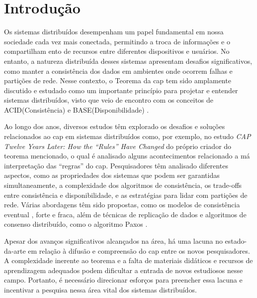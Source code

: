 
\chapter{Introdução}\label{cap:introducao}

Os sistemas distribuídos desempenham um papel fundamental em nossa sociedade cada vez mais conectada, permitindo a troca de informações e o compartilham
ento de recursos entre diferentes dispositivos e usuários. No entanto, a natureza distribuída desses sistemas apresentam desafios significativos, como manter a consistência dos dados em ambientes onde ocorrem falhas e partições de rede. Nesse contexto, o Teorema da \gls{cap} tem sido amplamente discutido e estudado como um importante princípio para projetar e entender sistemas distribuídos, visto que veio de encontro com os conceitos de ACID(Consistência) e BASE(Disponibilidade) \cite{ConsistencyInACIDAndCAPTheoremStackOverFlow2013}.

Ao longo dos anos, diversos estudos têm explorado os desafios e soluções relacionados ao \gls{cap} em sistemas distribuídos como, por exemplo, no estudo \textit{CAP Twelve Years Later: How the ``Rules'' Have Changed} \cite{BrewerTwentyYearsLaterEricBrewer2012} do próprio criador do teorema mencionado, o qual é analisado alguns acontecimentos relacionado a má interpretação das ``regras''    do \gls{cap}. Pesquisadores têm analisado diferentes aspectos, como as propriedades dos sistemas que podem ser garantidas simultaneamente, a complexidade dos algoritmos de consistência, os trade-offs entre consistência e disponibilidade, e as estratégias para lidar com partições de rede. Várias abordagens têm sido propostas, como os modelos de consistência eventual \cite{EventuallyConsistentWernerVogels2009}, forte e fraca, além de técnicas de replicação de dados e algoritmos de consenso distribuído, como o algoritmo Paxos \cite{PaxosMadeSimpleLamport2001}.

Apesar dos avanços significativos alcançados na área, há uma lacuna no estado-da-arte em relação à difusão e compreensão do \gls{cap} entre os novos pesquisadores. A complexidade inerente ao teorema e a falta de materiais didáticos e recursos de aprendizagem adequados podem dificultar a entrada de novos estudiosos nesse campo. Portanto, é necessário direcionar esforços para preencher essa lacuna e incentivar a pesquisa nessa área vital dos sistemas distribuídos.

